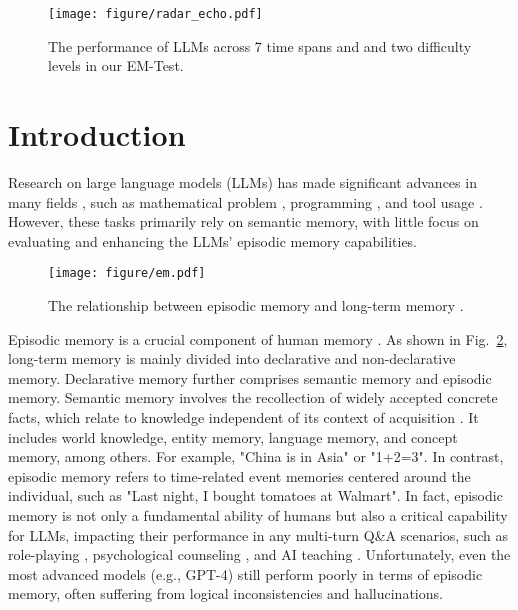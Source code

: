 \begin{figure}[t!]
  \vspace{-2mm}
    \texttt{[image: figure/radar\_echo.pdf]}
    \vspace{-6mm}
    \caption{The performance of LLMs across 7 time spans and and two difficulty levels in our EM-Test.}
    \label{fig:performance_llm}
    \vspace{-3mm}
\end{figure}

\section{Introduction}
\label{sec:intro}

Research on large language models (LLMs) has made significant advances in many fields \cite{naveed2023comprehensive,zhao2023survey}, such as mathematical problem \cite{liu2023mathematical}, programming \cite{zhang2023unifying}, and tool usage \cite{qin2024toollearningfoundationmodels}. However, these tasks primarily rely on semantic memory, with little focus on evaluating and enhancing the LLMs' episodic memory capabilities.

\begin{figure}[t!]
\centering

\texttt{[image: figure/em.pdf]} \\
\vspace{1mm}
\caption{The relationship between episodic memory and long-term memory \cite{squire2004memory}.}
\label{fig:em}
\vspace{-5mm}
\end{figure}

Episodic memory is a crucial component of human memory \cite{tulving1983elements,tulving1972episodic}. As shown in Fig.~\ref{fig:em}, long-term memory \cite{squire2004memory} is mainly divided into declarative and non-declarative memory. Declarative memory further comprises semantic memory and episodic memory. Semantic memory involves the recollection of widely accepted concrete facts, which relate to knowledge independent of its context of acquisition \cite{moscovitch2016episodic}. It includes world knowledge, entity memory, language memory, and concept memory, among others. For example, "China is in Asia" or "1+2=3". In contrast, episodic memory refers to time-related event memories centered around the individual, such as "Last night, I bought tomatoes at Walmart".
In fact, episodic memory is not only a fundamental ability of humans but also a critical capability for LLMs, impacting their performance in any multi-turn Q\&A scenarios, such as role-playing \cite{wang2023rolellm}, psychological counseling \cite{ke2024exploring}, and AI teaching \cite{dan2023educhat}. Unfortunately, even the most advanced models (e.g., GPT-4) still perform poorly in terms of episodic memory, often suffering from logical inconsistencies and hallucinations. 


